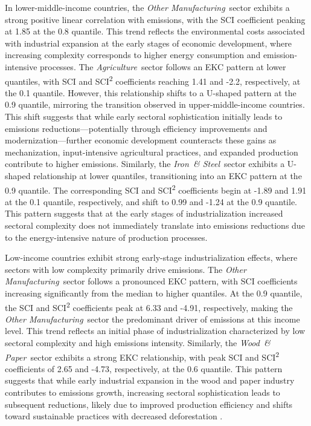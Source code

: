 \documentclass[10pt]{article}
\newcommand{\AG}{\textit{Agriculture}}
\newcommand{\IR}{\textit{Iron~\& Steel}}
\newcommand{\OT}{\textit{Other Manufacturing}}
\newcommand{\WO}{\textit{Wood~\& Paper}}
\begin{document}
In lower-middle-income countries, the \OT\ sector exhibits a strong positive linear correlation with emissions, with the SCI coefficient peaking at 1.85 at the 0.8 quantile. This trend reflects the environmental costs associated with industrial expansion at the early stages of economic development, where increasing complexity corresponds to higher energy consumption and emission-intensive processes. The \AG\ sector follows an EKC pattern at lower quantiles, with SCI and SCI\textsuperscript{2} coefficients reaching 1.41 and -2.2, respectively, at the 0.1 quantile. However, this relationship shifts to a U-shaped pattern at the 0.9 quantile, mirroring the transition observed in upper-middle-income countries. This shift suggests that while early sectoral sophistication initially leads to emissions reductions—potentially through efficiency improvements and modernization—further economic development counteracts these gains as mechanization, input-intensive agricultural practices, and expanded production contribute to higher emissions. Similarly, the \IR\ sector exhibits a U-shaped relationship at lower quantiles, transitioning into an EKC pattern at the 0.9 quantile. The corresponding SCI and SCI\textsuperscript{2} coefficients begin at -1.89 and 1.91 at the 0.1 quantile, respectively, and shift to 0.99 and -1.24 at the 0.9 quantile. This pattern suggests that at the early stages of industrialization increased sectoral complexity does not immediately translate into emissions reductions due to the energy-intensive nature of production processes.

Low-income countries exhibit strong early-stage industrialization effects, where sectors with low complexity primarily drive emissions. The \OT\ sector follows a pronounced EKC pattern, with SCI coefficients increasing significantly from the median to higher quantiles. At the 0.9 quantile, the SCI and SCI\textsuperscript{2} coefficients peak at 6.33 and -4.91, respectively, making the \OT\ sector the predominant driver of emissions at this income level. This trend reflects an initial phase of industrialization characterized by low sectoral complexity and high emissions intensity. Similarly, the \WO\ sector exhibits a strong EKC relationship, with peak SCI and SCI\textsuperscript{2} coefficients of 2.65 and -4.73, respectively, at the 0.6 quantile. This pattern suggests that while early industrial expansion in the wood and paper industry contributes to emissions growth, increasing sectoral sophistication leads to subsequent reductions, likely due to improved production efficiency and shifts toward sustainable practices with decreased deforestation \citep{GRIFFIN2018152}.
\end{document}
